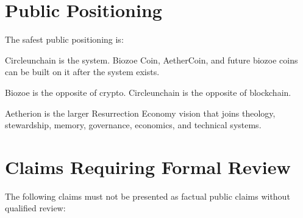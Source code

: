 ﻿\documentclass[12pt]{article}
\begin{document}
\section{Public Positioning}


The safest public positioning is:

Circleunchain is the system. Biozoe Coin, AetherCoin, and future biozoe coins can be built on it after the system exists.

Biozoe is the opposite of crypto. Circleunchain is the opposite of blockchain.

Aetherion is the larger Resurrection Economy vision that joins theology, stewardship, memory, governance, economics, and technical systems.

\section{Claims Requiring Formal Review}


The following claims must not be presented as factual public claims without qualified review:
\end{document}
